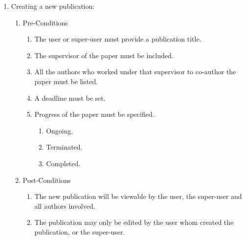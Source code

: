 \documentclass[hidelinks,a4paper,12pt]{article}
\begin{document}
\noindent 
\begin{enumerate}
	\item  Creating a new publication:
	
	\begin{enumerate}
		\item  Pre-Conditions
		
		\begin{enumerate}
			\item  The user or super-user must provide a publication title.
			
			\item  The supervisor of the paper must be included.
			
			\item  All the authors who worked under that supervisor to co-author the paper must be listed.
			
			\item  A deadline must be set.
			
			\item  Progress of the paper must be specified.
			
			\begin{enumerate}
				\item  Ongoing.
				
				\item  Terminated.
				
				\item  Completed.
			\end{enumerate}
		\end{enumerate}
		
		\item  Post-Conditions
		
		\begin{enumerate}
			\item  The new publication will be viewable by the user, the super-user and all authors involved.
			
			\item  The publication may only be edited by the user whom created the publication, or the super-user.
		\end{enumerate}
	\end{enumerate}
\end{enumerate}

\noindent 
\end{document}
